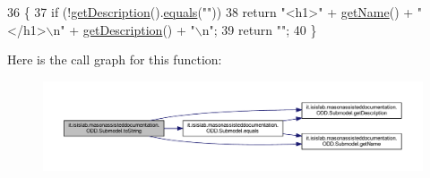 \begin{DoxyCode}
36                             \{
37         \textcolor{keywordflow}{if} (!\hyperlink{classit_1_1isislab_1_1masonassisteddocumentation_1_1_o_d_d_1_1_submodel_a4174d83304f84ad1c026c8096ea3a987}{getDescription}().\hyperlink{classit_1_1isislab_1_1masonassisteddocumentation_1_1_o_d_d_1_1_submodel_afef2a783ff6aaf811ced69506a527265}{equals}(\textcolor{stringliteral}{""}))
38             \textcolor{keywordflow}{return} \textcolor{stringliteral}{"<h1>"} + \hyperlink{classit_1_1isislab_1_1masonassisteddocumentation_1_1_o_d_d_1_1_submodel_a52d60158adf71622ba8554abb72a12b9}{getName}() + \textcolor{stringliteral}{"</h1>\(\backslash\)n"} + \hyperlink{classit_1_1isislab_1_1masonassisteddocumentation_1_1_o_d_d_1_1_submodel_a4174d83304f84ad1c026c8096ea3a987}{getDescription}() + \textcolor{stringliteral}{"\(\backslash\)n"};
39         \textcolor{keywordflow}{return} \textcolor{stringliteral}{""};
40     \}
\end{DoxyCode}


Here is the call graph for this function\-:\nopagebreak
\begin{figure}[H]
\begin{center}
\leavevmode
\includegraphics[width=350pt]{classit_1_1isislab_1_1masonassisteddocumentation_1_1_o_d_d_1_1_submodel_a15e128a6ac94c77a75d85a903a2d40a4_cgraph}
\end{center}
\end{figure}




